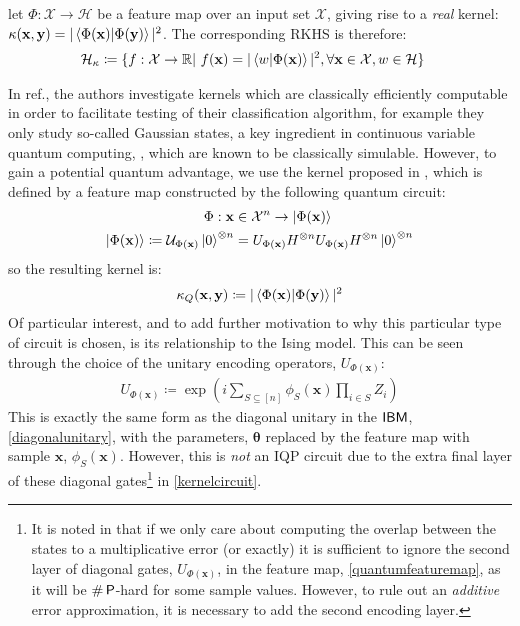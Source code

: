 \begin{theorem}
let $\Phi:\mathcal{X}\rightarrow \mathcal{H}$ be a feature map over an input set $\mathcal{X}$, giving rise to a \emph{real} kernel: $\kappa(\mathbf{x}, \mathbf{y}) = |\braket{\Phi(\mathbf{x})|\Phi(\mathbf{y})}|^2$. The corresponding RKHS is therefore:
\begin{align}
    \mathcal{H}_\kappa  \coloneqq \{&f:\mathcal{X} \rightarrow \mathbb{R}|\ f(\mathbf{x}) = |\braket{w|\Phi(\mathbf{x})}|^2, \forall \mathbf{x} \in \mathcal{X}, w\in \mathcal{H}\} \nonumber
\end{align}
\end{theorem}


In ref., the authors investigate kernels which are classically efficiently computable in order to facilitate testing of their classification algorithm, for example they only study so-called Gaussian states, a key ingredient in continuous variable quantum computing, , which are known to be classically simulable. However, to gain a potential quantum advantage, we use the kernel proposed in , which is defined by a feature map constructed by the following quantum circuit:
\begin{align}
    \Phi: \mathbf{x} &\in \mathcal{X}^n \rightarrow \ket{\Phi(\mathbf{x})} \label{quantumfeaturemap}\\
    \ket{\Phi(\mathbf{x})}  \coloneqq \mathcal{U}_{\Phi(\mathbf{x})}\ket{0}^{\otimes n} &= U_{\Phi(\mathbf{x})}H^{\otimes n}U_{\Phi(\mathbf{x})}H^{\otimes n}\ket{0}^{\otimes n} \label{kernelcircuit}
\end{align}
so the resulting kernel is:
\begin{align}
    \kappa_Q(\mathbf{x}, \mathbf{y})  \coloneqq |\braket{\Phi(\mathbf{x})|\Phi(\mathbf{y})}|^2 \label{quantumkernel_app}
\end{align}
Of particular interest, and to add further motivation to why this particular type of circuit is chosen, is its relationship to the Ising model. This can be seen through the choice of the unitary encoding operators, $U_{\Phi(\mathbf{x})}$:
\begin{align}
U_{\Phi(\mathbf{x})}  \coloneqq \exp\left(i\sum\limits_{S\subseteq [n]}\phi_S(\mathbf{x})\prod\limits_{i \in S}Z_i\right) \label{kernelcircuitunitary}
\end{align}
This is exactly the same form as the diagonal unitary in the $\textsf{IBM}$, \eqref{diagonalunitary}, with the parameters, ${\boldsymbol\theta}$ replaced by the feature map with sample $\mathbf{x}$, $\phi_S(\mathbf{x})$. However, this is \emph{not} an \textsf{IQP} circuit due to the extra final layer of these diagonal gates\footnote{It is noted in  that if we only care about computing the overlap between the states to a multiplicative error (or exactly) it is sufficient to ignore the second layer of diagonal gates, $U_{\Phi(\mathbf{x})}$, in the feature map, \eqref{quantumfeaturemap}, as it will be $\#\operatorname{\textsf{P}}$-hard for some sample values. However, to rule out an \emph{additive} error approximation, it is necessary to add the second encoding layer.} in \eqref{kernelcircuit}. 


